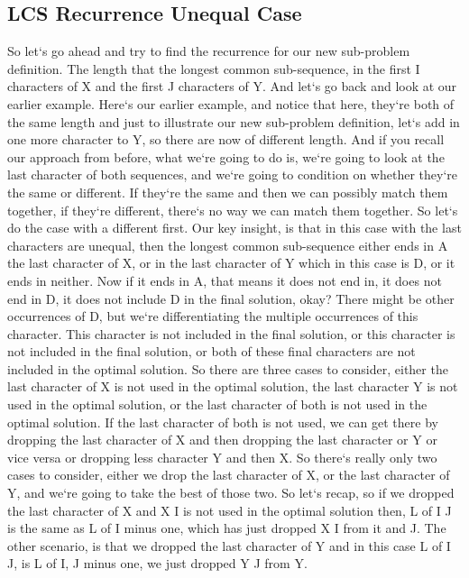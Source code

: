 \subsection{LCS  Recurrence Unequal Case}
So let`s go ahead and try to find the recurrence for our new sub-problem definition.
The length that the longest common sub-sequence, in the first I characters of X and the first J characters of Y\@.
And let`s go back and look at our earlier example.
Here`s our earlier example, and notice that here, they`re both of the same length and just to illustrate our new sub-problem definition, let`s add in one more character to Y, so there are now of different length.
And if you recall our approach from before, what we`re going to do is, we`re going to look at the last character of both sequences, and we`re going to condition on whether they`re the same or different.
If they`re the same and then we can possibly match them together, if they`re different, there`s no way we can match them together.
So let`s do the case with a different first.
Our key insight, is that in this case with the last characters are unequal, then the longest common sub-sequence either ends in A the last character of X, or in the last character of Y which in this case is D, or it ends in neither.
Now if it ends in A, that means it does not end in, it does not end in D, it does not include D in the final solution, okay? There might be other occurrences of D, but we`re differentiating the multiple occurrences of this character.
This character is not included in the final solution, or this character is not included in the final solution, or both of these final characters are not included in the optimal solution.
So there are three cases to consider, either the last character of X is not used in the optimal solution, the last character Y is not used in the optimal solution, or the last character of both is not used in the optimal solution.
If the last character of both is not used, we can get there by dropping the last character of X and then dropping the last character or Y or vice versa or dropping less character Y and then X\@.
So there`s really only two cases to consider, either we drop the last character of X, or the last character of Y, and we`re going to take the best of those two.
So let`s recap, so if we dropped the last character of X and X I is not used in the optimal solution then, L of I J is the same as L of I minus one, which has just dropped X I from it and J\@.
The other scenario, is that we dropped the last character of Y and in this case L of I J, is L of I, J minus one, we just dropped Y J from Y\@.
